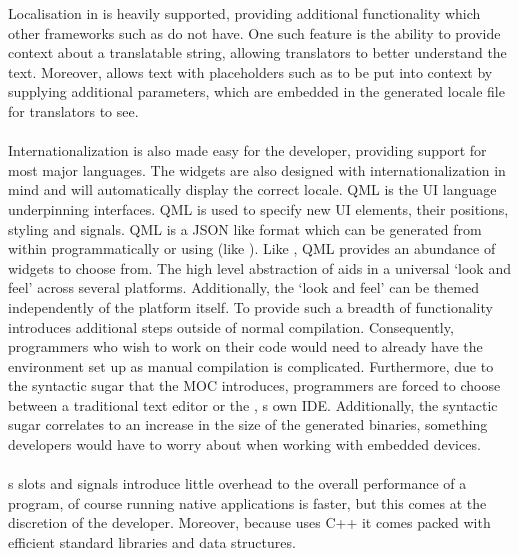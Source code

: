   Localisation in  is heavily supported, providing additional functionality which other frameworks such as  do not have\cite{qt_localisation}. One such feature is the ability to provide context about a translatable string, allowing translators to better understand the text. Moreover,  allows text with placeholders such as  to be put into context by supplying additional parameters, which are embedded in the generated locale file for translators to see. \\\\
  Internationalization is also made easy for the developer, providing support for most major languages\cite{qt_international}. The widgets are also designed with internationalization in mind and will automatically display the correct locale.
  QML is the UI language underpinning  interfaces\cite{qt_qml}. QML is used to specify new UI elements, their positions, styling and signals. QML is a JSON like format which can be generated from within  programmatically or using  (like ). Like , QML provides an abundance of widgets to choose from. The high level abstraction of  aids in a universal `look and feel' across several platforms. Additionally, the `look and feel' can be themed independently of the platform itself.
  To provide such a breadth of functionality  introduces additional steps outside of normal compilation. Consequently, programmers who wish to work on their code would need to already have the  environment set up as manual compilation is complicated. Furthermore, due to the syntactic sugar that the MOC introduces, programmers are forced to choose between a traditional text editor or the , s own IDE. Additionally,
  the syntactic sugar correlates to an increase in the size of the generated binaries, something developers would have to worry about when working with embedded devices.\\\\
  s slots and signals introduce little overhead to the overall performance of a program, of course running native applications is faster, but this comes at the discretion of the developer. Moreover, because  uses C++ it comes packed with efficient standard libraries and data structures.

